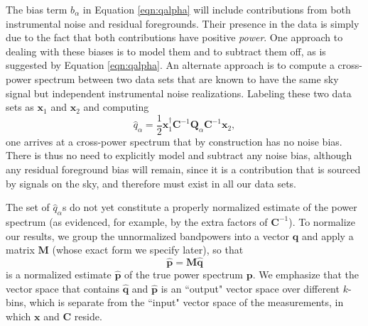 \documentclass[twocolumn,numberedappendix]{emulateapj} \shorttitle{PSA64}
\newcommand{\x}{\mathbf{x}} \newcommand{\xhat}{\hat{\mathbf{x}}}
\begin{document}
The bias term $b_{\alpha}$ in Equation \eqref{eqn:qalpha} will include contributions
from both instrumental noise and residual foregrounds. Their presence in the data
is simply due to the fact that both contributions have positive \emph{power}. One
approach to dealing with these biases is to model them and to subtract them off,
as is suggested by Equation \eqref{eqn:qalpha}. An alternate approach is to
compute a cross-power spectrum between two data sets that are known to have
the same sky signal but independent instrumental noise realizations. Labeling
these two data sets as $\x_1$ and $\x_2$ and computing
\begin{equation}\label{eqn:qalpha_unbiased}
    \hat{q}_{\alpha} =
\frac{1}{2}\x_{1}^\dagger\mathbf{C}^{-1}\mathbf{Q}_{\alpha}\mathbf{C}^{-1}\x_{2},
\end{equation}
one arrives at a cross-power spectrum that by construction has no noise bias. There is
thus no need to explicitly model and subtract any noise bias, although any residual foreground
bias will remain, since it is a contribution that is sourced by signals on the sky, and therefore
must exist in all our data sets.

The set of $\hat{q}_{\alpha}$s do not yet constitute a properly normalized estimate of
the power spectrum (as evidenced, for example, by the extra factors of $\mathbf{C}^{-1}$). 
To normalize our results, we group the unnormalized bandpowers into a vector $\mathbf{\hat{q}}$
and apply a matrix $\mathbf{M}$ (whose exact form we specify later), so that
\begin{equation}\label{eqn:pspec_norm}
    \mathbf{\hat{p}} = \mathbf{M}\hat{\mathbf{q}}
\end{equation}
is a normalized estimate $\mathbf{\hat{p}}$ of the true power spectrum $\mathbf{p}$. We emphasize
that the vector space that contains $\hat{\mathbf{q}}$ and $\hat{\mathbf{p}}$ is an ``output" vector
space over different $k$-bins, which is separate from the ``input" vector space of the measurements, in which $\x$ and $\mathbf{C}$ reside.
\end{document}
